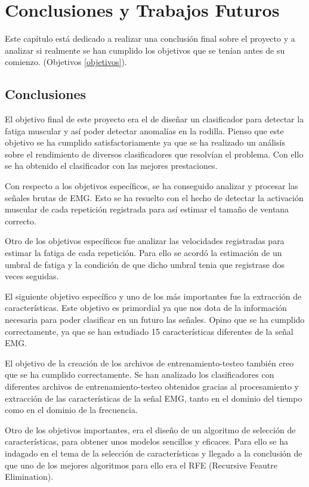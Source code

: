 \chapter{Conclusiones y Trabajos Futuros}
Este capítulo está dedicado a realizar una conclusión final sobre el proyecto y a analizar si realmente se han cumplido los objetivos que se tenían antes de su comienzo. (Objetivos \ref{objetivos}).

\section{Conclusiones}

El objetivo final de este proyecto era el de diseñar un clasificador para detectar la fatiga muscular y así poder detectar anomalías en la rodilla. Pienso que este objetivo se ha cumplido satisfactoriamente ya que se ha realizado un análisis sobre el rendimiento de diversos clasificadores que resolvían el problema. Con ello se ha obtenido el clasificador con las mejores prestaciones. 

Con respecto a los objetivos específicos, se ha conseguido analizar y procesar las señales brutas de EMG. Esto se ha resuelto con el hecho de detectar la activación muscular de cada repetición registrada para así estimar el tamaño de ventana correcto.

Otro de los objetivos específicos fue analizar las velocidades registradas para estimar la fatiga de cada repetición. Para ello se acordó la estimación de un umbral de fatiga y la condición de que dicho umbral tenia que registrase dos veces seguidas.

El siguiente objetivo específico y uno de los más importantes fue la extracción de características. Este objetivo es primordial ya que nos dota de la información necesaria para poder clasificar en un futuro las señales. Opino que se ha cumplido correctamente, ya que se han estudiado 15 características diferentes de la señal EMG.

El objetivo de la creación de los archivos de entrenamiento-testeo también creo que se ha cumplido correctamente. Se han analizado los clasificadores con diferentes archivos de entrenamiento-testeo obtenidos gracias al procesamiento y extracción de las características de la señal EMG, tanto en el dominio del tiempo como en el dominio de la frecuencia.

Otro de los objetivos importantes, era el diseño de un algoritmo de selección de características, para obtener unos modelos sencillos y eficaces. Para ello se ha indagado en el tema de la selección de características y llegado a la conclusión de que uno de los mejores algoritmos para ello era el RFE (Recursive Feautre Elimination).


